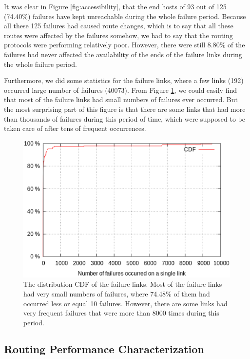 \documentclass[conference, twocolumn, oneside, 10pt]{IEEEtran}
\begin{document}
It was clear in Figure \ref{fig:accessibility}, that the end hosts of 93 out of 125 (74.40\%) failures have kept unreachable during the whole failure period. Because all these 125 failures had caused route changes, which is to say that all these routes were affected by the failures somehow, we had to say that the routing protocols were performing relatively poor. However, there were still 8.80\% of the failures had never affected the availability of the ends of the failure links during the whole failure period.

Furthermore, we did some statistics for the failure links, where a few links (192) occurred large number of failures (40073). From Figure \ref{fig:distribution}, we could easily find that most of the failure links had small numbers of failures ever occurred. But the most surprising part of this figure is that there are some links that had more than thousands of failures during this period of time, which were supposed to be taken care of after tens of frequent occurrences.

\begin{figure}[h!]
\centering
\includegraphics[scale=0.4]{plot/failure_distribution.eps}
\caption{The distribution CDF of the failure links. Most of the failure links had very small numbers of failures, where 74.48\% of them had occurred less or equal 10 failures. However, there are some links had very frequent failures that were more than 8000 times during this period.}
\label{fig:distribution}
\end{figure}

\subsection{Routing Performance Characterization}
\end{document}
